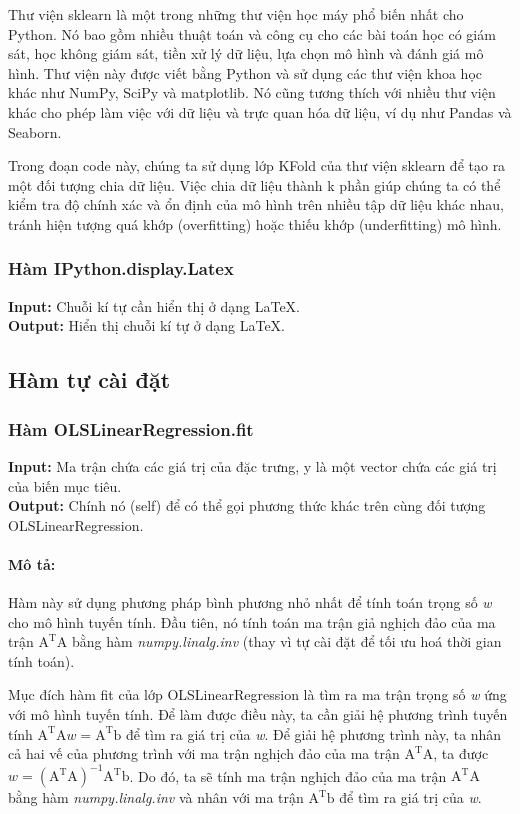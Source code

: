 \documentclass[]{article}
\begin{document}
Thư viện sklearn là một trong những thư viện học máy phổ biến nhất cho Python. Nó bao gồm nhiều thuật toán và công cụ cho các bài toán học có giám sát, học không giám sát, tiền xử lý dữ liệu, lựa chọn mô hình và đánh giá mô hình. Thư viện này được viết bằng Python và sử dụng các thư viện khoa học khác như NumPy, SciPy và matplotlib. Nó cũng tương thích với nhiều thư viện khác cho phép làm việc với dữ liệu và trực quan hóa dữ liệu, ví dụ như Pandas và Seaborn. \cite{datagyIntroductionScikitLearn}

Trong đoạn code này, chúng ta sử dụng lớp KFold của thư viện sklearn để tạo ra một đối tượng chia dữ liệu. Việc chia dữ liệu thành k phần giúp chúng ta có thể kiểm tra độ chính xác và ổn định của mô hình trên nhiều tập dữ liệu khác nhau, tránh hiện tượng quá khớp (overfitting) hoặc thiếu khớp (underfitting) mô hình.

\subsubsection{Hàm IPython.display.Latex}
\noindent
\textbf{Input:} Chuỗi kí tự cần hiển thị ở dạng \LaTeX. \\
\textbf{Output:} Hiển thị chuỗi kí tự ở dạng \LaTeX.

\subsection{Hàm tự cài đặt}
\subsubsection{Hàm OLSLinearRegression.fit} \label{fit}
\noindent
\textbf{Input:} Ma trận chứa các giá trị của đặc trưng, y là một vector chứa các giá trị của biến mục tiêu. \\
\textbf{Output:} Chính nó (self) để có thể gọi phương thức khác trên cùng đối tượng OLSLinearRegression.
\paragraph{Mô tả:}

Hàm này sử dụng phương pháp bình phương nhỏ nhất để tính toán trọng số \textit{w} cho mô hình tuyến tính. Đầu tiên, nó tính toán ma trận giả nghịch đảo của ma trận $\text{A}^\text{T} \text{A}$ bằng hàm \textit{numpy.linalg.inv} (thay vì tự cài đặt để tối ưu hoá thời gian tính toán). 

Mục đích hàm fit của lớp OLSLinearRegression là tìm ra ma trận trọng số \textit{w} ứng với mô hình tuyến tính. Để làm được điều này, ta cần giải hệ phương trình tuyến tính $\text{A}^\text{T} \text{A} \textit{w} = \text{A}^\text{T} \text{b}$ để tìm ra giá trị của \textit{w}. Để giải hệ phương trình này, ta nhân cả hai vế của phương trình với ma trận nghịch đảo của ma trận $\text{A}^\text{T} \text{A}$, ta được $\textit{w} = (\text{A}^\text{T} \text{A})^{-1} \text{A}^\text{T} \text{b}$. Do đó, ta sẽ tính ma trận nghịch đảo của ma trận $\text{A}^\text{T} \text{A}$ bằng hàm \textit{numpy.linalg.inv} và nhân với ma trận $\text{A}^\text{T} \text{b}$ để tìm ra giá trị của \textit{w}.
\end{document}
